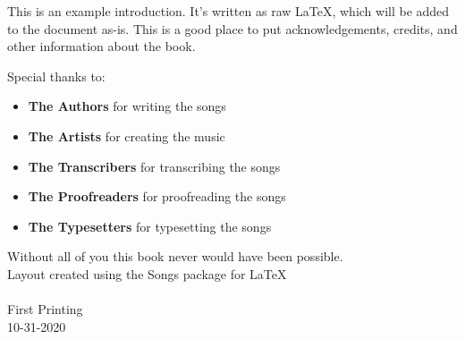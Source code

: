 \vspace*{\baselineskip}

This is an example introduction. It's written as raw LaTeX, which will be added 
to the document as-is. This is a good place to put acknowledgements,
credits, and other information about the book.

Special thanks to:\\
\begin{itemize}
  \item \textbf{The Authors} for writing the songs
  \item \textbf{The Artists} for creating the music
  \item \textbf{The Transcribers} for transcribing the songs
  \item \textbf{The Proofreaders} for proofreading the songs
  \item \textbf{The Typesetters} for typesetting the songs

\end{itemize}
Without all of you this book never would have been possible. \\

Layout created using the Songs package for \LaTeX   
\\
\\

\center
First Printing \\

10-31-2020 \\

\clearpage
